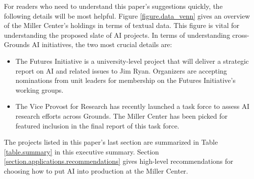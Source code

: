 \documentclass[12pt, oneside]{article}   	%
\begin{document}
For readers who need to understand this paper's suggestions quickly, the following details will be most helpful.  Figure \ref{figure.data_venn} gives an overview of the Miller Center's holdings in terms of textual data.  This figure is vital for understanding the proposed slate of AI projects.  In terms of understanding cross-Grounds AI initiatives, the two most crucial details are:
\begin{itemize}
\item The Futures Initiative is a university-level project that will deliver a strategic report on AI and related issues to Jim Ryan.  Organizers are accepting nominations from unit leaders for membership on the Futures Initiative's working groups.
\item The Vice Provost for Research has recently launched a task force to assess AI research efforts across Grounds.  The Miller Center has been picked for featured inclusion in the final report of this task force.
\end{itemize} 
The projects listed in this paper's last section are summarized in Table \ref{table.summary} in this executive summary.  Section \ref{section.applications.recommendations} gives high-level recommendations for choosing how to put AI into production at the Miller Center.  
\end{document}
